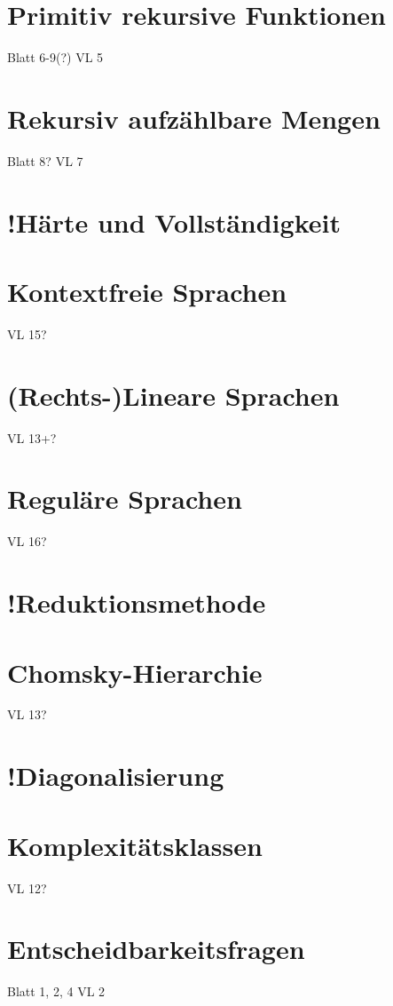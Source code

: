 \documentclass[12pt,a4paper]{article} %
\begin{document}
	\section{Primitiv rekursive Funktionen}
	Blatt 6-9(?)
	VL 5
	
	\section{Rekursiv aufzählbare Mengen}
	Blatt 8?
	VL 7
	
	\section{!Härte und Vollständigkeit}
	
	
	\section{Kontextfreie Sprachen}
	VL 15?
	
	\section{(Rechts-)Lineare Sprachen}
	VL 13+?
	
	\section{Reguläre Sprachen}
	VL 16?
	
	\section{!Reduktionsmethode}
	
	
	\section{Chomsky-Hierarchie}
	VL 13?
	
	\section{!Diagonalisierung}
	
	
	\section{Komplexitätsklassen}
	VL 12?
	
	\section{Entscheidbarkeitsfragen}
	Blatt 1, 2, 4
	VL 2
	
\end{document}
